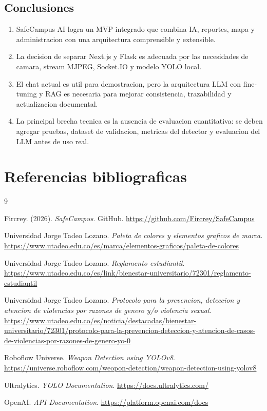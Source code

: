 \documentclass[11pt,letterpaper]{article}
\begin{document}
\subsection{Conclusiones}

\begin{enumerate}[label=\arabic*.]
    \item SafeCampus AI logra un MVP integrado que combina IA, reportes, mapa y administracion con una arquitectura comprensible y extensible.
    \item La decision de separar Next.js y Flask es adecuada por las necesidades de camara, stream MJPEG, Socket.IO y modelo YOLO local.
    \item El chat actual es util para demostracion, pero la arquitectura LLM con fine-tuning y RAG es necesaria para mejorar consistencia, trazabilidad y actualizacion documental.
    \item La principal brecha tecnica es la ausencia de evaluacion cuantitativa: se deben agregar pruebas, dataset de validacion, metricas del detector y evaluacion del LLM antes de uso real.
\end{enumerate}

\section{Referencias bibliograficas}

\begin{thebibliography}{9}

Fircrey. (2026). \textit{SafeCampus}. GitHub. \url{https://github.com/Fircrey/SafeCampus}

Universidad Jorge Tadeo Lozano. \textit{Paleta de colores y elementos graficos de marca}. \url{https://www.utadeo.edu.co/es/marca/elementos-graficos/paleta-de-colores}

Universidad Jorge Tadeo Lozano. \textit{Reglamento estudiantil}. \url{https://www.utadeo.edu.co/es/link/bienestar-universitario/72301/reglamento-estudiantil}

Universidad Jorge Tadeo Lozano. \textit{Protocolo para la prevencion, deteccion y atencion de violencias por razones de genero y/o violencia sexual}. \url{https://www.utadeo.edu.co/es/noticia/destacadas/bienestar-universitario/72301/protocolo-para-la-prevencion-deteccion-y-atencion-de-casos-de-violencias-por-razones-de-genero-yo-0}

Roboflow Universe. \textit{Weapon Detection using YOLOv8}. \url{https://universe.roboflow.com/weopon-detection/weapon-detection-using-yolov8}

Ultralytics. \textit{YOLO Documentation}. \url{https://docs.ultralytics.com/}

OpenAI. \textit{API Documentation}. \url{https://platform.openai.com/docs}

\end{thebibliography}
\end{document}
